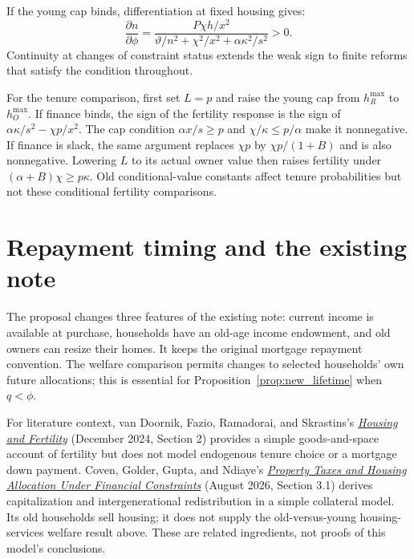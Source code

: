 \documentclass[11pt]{article}
\begin{document}
If the young cap binds, differentiation at fixed housing gives:
\begin{equation}
\frac{\partial n}{\partial\phi}
=\frac{P\chi h/x^2}
{\vartheta/n^2+\chi^2/x^2+\alpha\kappa^2/s^2}>0.
\end{equation}
Continuity at changes of constraint status extends the weak sign to finite
reforms that satisfy the condition throughout.

For the tenure comparison, first set $L=p$ and raise the young cap from
$h_R^{\max}$ to $h_O^{\max}$. If finance binds, the sign of the fertility
response is the sign of $\alpha\kappa/s^2-\chi p/x^2$. The cap condition
$\alpha x/s\ge p$ and $\chi/\kappa\le p/\alpha$ make it nonnegative.
If finance is slack, the same argument replaces $\chi p$ by
$\chi p/(1+B)$ and is also nonnegative. Lowering $L$ to its actual owner
value then raises fertility under $(\alpha+B)\chi\ge p\kappa$.
Old conditional-value constants affect tenure probabilities but not these
conditional fertility comparisons.

\section{Repayment timing and the existing note}

The proposal changes three features of the existing note: current income is
available at purchase, households have an old-age income endowment, and old
owners can resize their homes. It keeps the original mortgage repayment
convention. The welfare comparison permits changes to selected households'
own future allocations; this is essential for
Proposition~\ref{prop:new_lifetime} when $q<\phi$.

For literature context, van Doornik, Fazio, Ramadorai, and Skrastins's
\href{https://bcb.gov.br/content/publicacoes/WorkingPaperSeries/WP612.pdf}{\emph{Housing and Fertility}}
(December 2024, Section 2) provides a simple
goods-and-space account of fertility but does not model endogenous tenure
choice or a mortgage down payment. Coven, Golder, Gupta, and Ndiaye's
\href{https://abdouecon.github.io/research/papers/Property_Tax.pdf}{\emph{Property Taxes and Housing Allocation Under Financial Constraints}}
(August 2026, Section 3.1) derives capitalization and intergenerational
redistribution in a simple collateral model. Its old households sell housing;
it does not supply the old-versus-young housing-services welfare result above.
These are related ingredients, not proofs of this model's conclusions.
\end{document}
